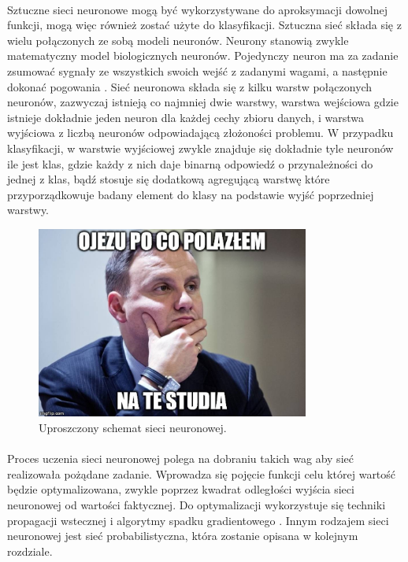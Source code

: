 \documentclass[a4paper,12pt,twoside]{article}
\begin{document}
\paragraph{}
Sztuczne sieci neuronowe mogą być wykorzystywane do aproksymacji dowolnej funkcji, mogą więc również zostać użyte do klasyfikacji. Sztuczna sieć składa się z wielu połączonych ze sobą modeli neuronów. Neurony stanowią zwykle matematyczny model biologicznych neuronów. Pojedynczy neuron ma za zadanie zsumować sygnały ze wszystkich swoich wejść z zadanymi wagami, a następnie dokonać pogowania \cite{nn}. Sieć neuronowa składa się z kilku warstw  połączonych neuronów, zazwyczaj istnieją co najmniej dwie warstwy, warstwa wejściowa gdzie istnieje dokładnie jeden neuron dla każdej cechy zbioru danych, i warstwa wyjściowa z liczbą neuronów odpowiadającą złożoności problemu. W przypadku klasyfikacji, w warstwie wyjściowej zwykle znajduje się dokładnie tyle neuronów ile jest klas, gdzie każdy z nich daje binarną odpowiedź o przynależności do jednej z klas, bądź stosuje się dodatkową agregującą warstwę które przyporządkowuje badany element do klasy na podstawie wyjść poprzedniej warstwy. 
\begin{figure}[h]
    \centering
    \includegraphics[width=0.8\textwidth]{dudel.jpg}
    \caption{Uproszczony schemat sieci neuronowej.}
\end{figure}
\paragraph{}
Proces uczenia sieci neuronowej polega na dobraniu takich wag aby sieć realizowała pożądane zadanie. Wprowadza się pojęcie funkcji celu której wartość będzie optymalizowana, zwykle poprzez kwadrat odległości wyjścia sieci neuronowej od wartości faktycznej. Do optymalizacji wykorzystuje się techniki propagacji wstecznej i algorytmy spadku gradientowego \cite{nn}.
Innym rodzajem sieci neuronowej jest sieć probabilistyczna, która zostanie opisana w kolejnym rozdziale.
\newpage
\thispagestyle{empty}
\mbox{}
\end{document}
